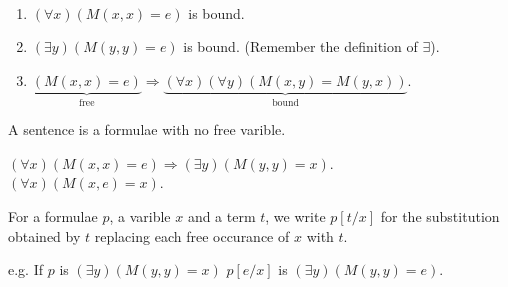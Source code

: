 \begin{example}
~\\
\begin{enumerate}
\item $(\forall x)(M(x,x)=e)$ is bound.\\
\item $(\exists y)(M(y,y)=e)$ is bound. (Remember the definition of $\exists$).\\
\item $\underbrace{(M(x,x)=e)}_\text{free} \Rightarrow \underbrace{(\forall x)(\forall y)(M(x,y)=M(y,x))}_\text{bound}$.
\end{enumerate}
\end{example}
\begin{definition} A sentence is a formulae with no free varible.
\end{definition}
\begin{example} $(\forall x)(M(x,x)=e) \Rightarrow (\exists y)(M(y,y)=x)$. \\
$(\forall x)(M(x,e)=x)$.
\end{example}
\begin{definition}
For a formulae $p$, a varible $x$ and a term $t$,
we write $p[t/x]$ for the substitution obtained by $t$ replacing
each free occurance of $x$ with $t$.
\end{definition}
e.g. If $p$ is $(\exists y)(M(y,y)=x)$ $p[e/x]$ is $(\exists y)(M(y,y)=e)$.\\
